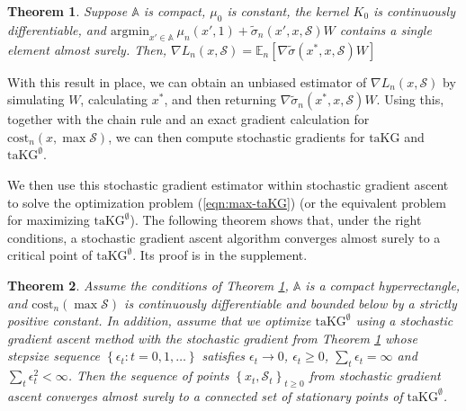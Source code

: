 \documentclass[letterpaper]{article}
\newcommand{\cost}{\text{cost}}
\newcommand{\bmu}[1]{\bm{\mu}^{(#1)}}
\newcommand{\taKG}{\text{taKG}}
\newcommand{\taKGE}{\text{taKG}^\emptyset}
\newtheorem{theorem}{Theorem}
\numberwithin{equation}{section}
\renewcommand{\S}{\mathcal{S}}
\newcommand{\eqn}[1]{(\ref{eqn:#1})}
\newcommand{\loss}{L}
\begin{document}


\begin{theorem}
\label{stochastic_gradient}
Suppose $\mathbb{A}$ is compact, $\mu_0$ is constant, the kernel $K_0$ is continuously differentiable, and $\mathrm{argmin}_{x'\in\mathbb{A}}\ \mu_{n}(x', 1)+\tilde{\sigma}_n\left(x', x, \S\right)W$ contains a single element almost surely. Then, $\nabla \loss_n(x,\S) = \mathbb{E}_n\left[ \nabla \tilde{\sigma}(x^*,x,\S) W \right]$
\end{theorem}

With this result in place, we can obtain an unbiased estimator of $\nabla \loss_n(x,\S)$ by simulating $W$, calculating $x^*$, and then returning $\nabla \tilde{\sigma}_n(x^*,x,\S) W$.
Using this, together with the chain rule and an exact gradient calculation for $\text{cost}_n(x,\max \mathcal{S})$,
we can then compute stochastic gradients for $\taKG$ and $\taKGE$.

We then use this stochastic gradient estimator within stochastic gradient ascent \citep{kushner2003stochastic}
to solve the optimization problem \eqn{max-taKG} (or the equivalent problem for maximizing $\taKGE$).  The following theorem shows that, under the right conditions, a stochastic gradient ascent algorithm converges almost surely to a critical point of $\taKGE$. Its proof is in the supplement. 

\begin{theorem}
Assume the conditions of Theorem \ref{stochastic_gradient}, $\mathbb{A}$ is a compact hyperrectangle, and $\cost_n(\max \mathcal{S})$
is continuously differentiable and bounded below by a strictly positive constant. In
addition, assume that we optimize $\taKGE$ using a stochastic gradient
ascent method with the stochastic gradient from Theorem \ref{stochastic_gradient} whose stepsize
sequence $\left\{ \epsilon_{t}:t=0,1,\ldots\right\} $ 
satisfies $\epsilon_{t}\rightarrow0$, $\epsilon_{t}\geq0$,
$\sum_{t}\epsilon_{t}=\infty$ and $\sum_{t}\epsilon_{t}^{2}<\infty$.
Then the sequence of points $\left\{ x_{t}, \S_{t}\right\} _{t\geq0}$ from stochastic gradient ascent
converges almost surely to a connected set of stationary points of $\taKGE$.
\label{t:convergence}
\end{theorem}
\end{document}
